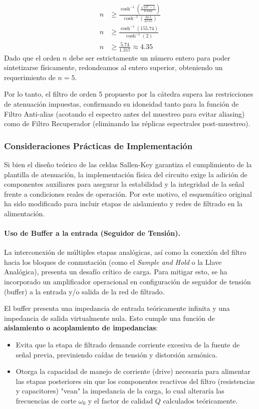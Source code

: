 \begin{align*}
	n &\ge \frac{\cosh^{-1}\left(\frac{\sqrt{10^4-1}}{0.642}\right)}{\cosh^{-1}\left(\frac{44.1}{22.05}\right)} \\[1ex]
	n &\ge \frac{\cosh^{-1}(155.74)}{\cosh^{-1}(2)} \\[1ex]
	n &\ge \frac{5.74}{1.317} \approx 4.35
\end{align*}
\newpage
Dado que el orden $n$ debe ser estrictamente un número entero para poder sintetizarse físicamente, redondeamos al entero superior, obteniendo un requerimiento de $n = 5$. 

Por lo tanto, el filtro de orden 5 propuesto por la cátedra supera las restricciones de atenuación impuestas, confirmando su idoneidad tanto para la función de Filtro Anti-alias (acotando el espectro antes del muestreo para evitar aliasing) como de Filtro Recuperador (eliminando las réplicas espectrales post-muestreo).

\subsubsection{Consideraciones Prácticas de Implementación}

Si bien el diseño teórico de las celdas Sallen-Key garantiza el cumplimiento de la plantilla de atenuación, la implementación física del circuito exige la adición de componentes auxiliares para asegurar la estabilidad y la integridad de la señal frente a condiciones reales de operación. Por este motivo, el esquemático original ha sido modificado para incluir etapas de aislamiento y redes de filtrado en la alimentación.

\paragraph{Uso de Buffer a la entrada (Seguidor de Tensión).}
La interconexión de múltiples etapas analógicas, así como la conexión del filtro hacia los bloques de conmutación (como el \textit{Sample and Hold} o la Llave Analógica), presenta un desafío crítico de carga. Para mitigar esto, se ha incorporado un amplificador operacional en configuración de seguidor de tensión (buffer) a la entrada y/o salida de la red de filtrado.

El buffer presenta una impedancia de entrada teóricamente infinita y una impedancia de salida virtualmente nula. Esto cumple una función de \textbf{aislamiento o acoplamiento de impedancias}: 
\begin{itemize}
	\item Evita que la etapa de filtrado demande corriente excesiva de la fuente de señal previa, previniendo caídas de tensión y distorsión armónica.
	\item Otorga la capacidad de manejo de corriente (drive) necesaria para alimentar las etapas posteriores sin que los componentes reactivos del filtro (resistencias y capacitores) "vean" la impedancia de la carga, lo cual alteraría las frecuencias de corte $\omega_0$ y el factor de calidad $Q$ calculados teóricamente.
\end{itemize}
\newpage
